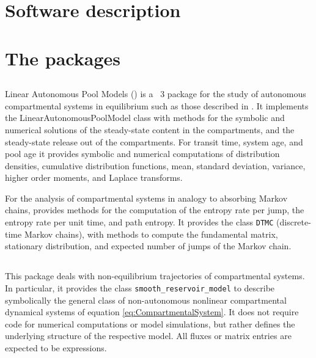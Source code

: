 
\section{Software description}
\section{The \python{} packages}
\label{sec:PythonPackages}
\subsection{\LAPM{}}
Linear Autonomous Pool Models (\LAPM{}) is a \python\ 3 package for the study of autonomous compartmental systems in equilibrium such as those described in . 
It implements the LinearAutonomousPoolModel class with methods for the
symbolic and numerical solutions of the steady-state content in the compartments, and the steady-state release out of the compartments. For transit time, system age, and pool age it provides symbolic and numerical computations of distribution densities, cumulative distribution functions, mean, standard deviation, variance, higher order moments, and Laplace transforms. 

For the analysis of compartmental systems in analogy to absorbing Markov chains, \LAPM{} provides methods for the computation of the entropy rate per jump, the entropy rate per unit time, and path entropy. It provides the class \texttt{DTMC} (discrete-time Markov chains), with methods to compute the fundamental matrix, stationary distribution, and expected number of jumps of the Markov chain.

\subsection{\CompartmentalSystems{}}
This package deals with non-equilibrium trajectories of compartmental systems.
In particular, it provides the class \texttt{smooth\_reservoir\_model} to describe
symbolically the general class of non-autonomous nonlinear compartmental
dynamical systems of equation \eqref{eq:CompartmentalSystem}. It does not
require code for numerical computations or model simulations, but rather defines the underlying structure of the respective model. 
All fluxes or matrix entries are expected to be \sympy{} expressions.

